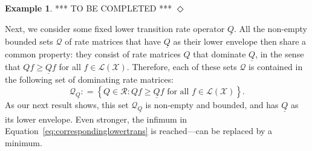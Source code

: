 \documentclass[10pt]{paper}
\theoremstyle{definition}
\newtheorem{exmp}{Example}%
\newcommand{\states}{\mathcal{X}}
\newcommand{\gambles}{\mathcal{L}}
\newcommand{\gamblesX}{\gambles(\states)}
\newcommand{\rateset}{\mathcal{Q}}
\newcommand{\lrate}{\underline{Q}}
\newcommand{\coloneqq}{:\!=}
\newcommand{\exampleend}{\hfill$\Diamond$}
\begin{document}
\begin{exmp}
*** TO BE COMPLETED ***
\exampleend
\end{exmp}

Next, we consider some fixed lower transition rate operator $\lrate$.
All the non-empty bounded sets $\rateset$ of rate matrices that have $\lrate$ as their lower envelope then share a common property: they consist of rate matrices $Q$ that dominate $\lrate$, in the sense that $Qf\geq\lrate f$ for all $f\in\gamblesX$. Therefore, each of these sets $\rateset$ is contained in the following set of dominating rate matrices:
\begin{equation}\label{eq:dominatingratematrices}
\rateset_{\lrate}\coloneqq
\left\{
Q\in\mathcal{R}
\colon
Qf\geq\lrate f\text{ for all $f\in\gamblesX$}
\right\}.
\end{equation}
As our next result shows, this set $\rateset_{\lrate}$ is non-empty and bounded, and has $\lrate$ as its lower envelope. Even stronger, the infimum in Equation~\eqref{eq:correspondinglowertrans} is reached---can be replaced by a minimum.
\end{document}
